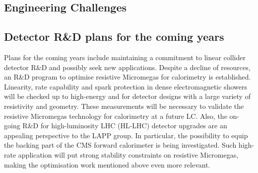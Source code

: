 \subsection{Engineering Challenges}


\subsection{Detector R\&D plans for the coming years}

Plans for the coming years include maintaining a commitment to linear collider detector R\&D and possibly seek new applications. Despite a decline of resources, an R\&D program to optimise resistive Micromegas for calorimetry is established. Linearity, rate capability and spark protection in dense electromagnetic showers will be checked up to high-energy and for detector designs with a large variety of resistivity and geometry. These measurements will be necessary to validate the resistive Micromegas technology for calorimetry at a future LC. Also, the on-going R\&D for high-luminosity LHC (HL-LHC) detector upgrades are an appealing perspective to the LAPP group. In particular, the possibility to equip the backing part of the CMS forward calorimeter is being investigated. Such high-rate application will put strong stability constraints on resistive Micromegas, making the optimisation work mentioned above even more relevant.



